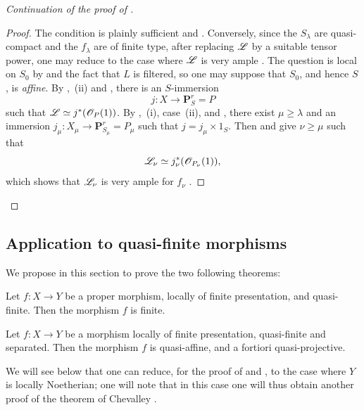 \begin{proof}[Continuation of the proof of ]
\begin{proof}
The condition is plainly sufficient  and . Conversely, since the $S_\lambda$ are quasi-compact and the $f_\lambda$ are of finite type, after replacing $\mathscr{L}$ by a suitable tensor power, one may reduce to the case where $\mathscr{L}$ is very ample . The question is local on $S_0$ by  and the fact that $L$ is filtered, so one may suppose that $S_0$, and hence $S$, is \emph{affine}. By ,~(ii) and , there is an $S$-immersion
\[
  j:X\longrightarrow\mathbf{P}^r_S=P
\]
such that $\mathscr{L}\simeq j^*(\mathscr{O}_P(1))$. By ,~(i), case~(ii), and , there exist $\mu\geqslant\lambda$ and an immersion $j_\mu:X_\mu\to\mathbf{P}^r_{S_\mu}=P_\mu$ such that $j=j_\mu\times1_S$. Then  and  give $\nu\geqslant\mu$ such that
\[
  \mathscr{L}_\nu\simeq j_\nu^*(\mathscr{O}_{P_\nu}(1)),
\]
which shows that $\mathscr{L}_\nu$ is very ample for $f_\nu$ .
\end{proof}
\end{proof}

\subsection{Application to quasi-finite morphisms}
\label{subsection:IV.8.11}
\label{IV.8.11}

We propose in this section to prove the two following theorems:

\begin{theorem}[8.11.1]
\label{IV.8.11.1}
Let $f:X\to Y$ be a proper morphism, locally of finite presentation, and quasi-finite.
Then the morphism $f$ is finite.
\end{theorem}

\begin{theorem}[8.11.2]
\label{IV.8.11.2}
Let $f:X\to Y$ be a morphism locally of finite presentation, quasi-finite and separated.
Then the morphism $f$ is quasi-affine, and a fortiori quasi-projective.
\end{theorem}

\begin{remark}[8.11.3]
\label{IV.8.11.3}
We will see below that one can reduce, for the proof of  and , to the case where $Y$ is locally Noetherian; one will note that in this case one will thus obtain another proof of the theorem of Chevalley .
\end{remark}

